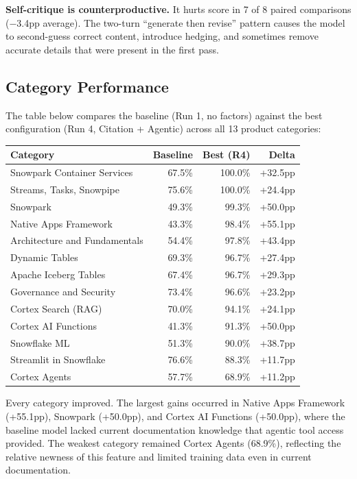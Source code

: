 \documentclass[11pt,letterpaper]{article}
\begin{document}
\textbf{Self-critique is counterproductive.} It hurts score in 7 of 8 paired comparisons ($-$3.4pp average). The two-turn ``generate then revise'' pattern causes the model to second-guess correct content, introduce hedging, and sometimes remove accurate details that were present in the first pass.

\subsection{Category Performance}

The table below compares the baseline (Run 1, no factors) against the best configuration (Run 4, Citation + Agentic) across all 13 product categories:

\begin{table}[H]
\centering
\small
\begin{tabular}{l r r r}
\toprule
\textbf{Category} & \textbf{Baseline} & \textbf{Best (R4)} & \textbf{Delta} \\
\midrule
Snowpark Container Services  & 67.5\% & 100.0\% & +32.5pp \\
Streams, Tasks, Snowpipe     & 75.6\% & 100.0\% & +24.4pp \\
Snowpark                     & 49.3\% & 99.3\%  & +50.0pp \\
Native Apps Framework        & 43.3\% & 98.4\%  & +55.1pp \\
Architecture and Fundamentals & 54.4\% & 97.8\% & +43.4pp \\
Dynamic Tables               & 69.3\% & 96.7\%  & +27.4pp \\
Apache Iceberg Tables        & 67.4\% & 96.7\%  & +29.3pp \\
Governance and Security      & 73.4\% & 96.6\%  & +23.2pp \\
Cortex Search (RAG)          & 70.0\% & 94.1\%  & +24.1pp \\
Cortex AI Functions          & 41.3\% & 91.3\%  & +50.0pp \\
Snowflake ML                 & 51.3\% & 90.0\%  & +38.7pp \\
Streamlit in Snowflake       & 76.6\% & 88.3\%  & +11.7pp \\
Cortex Agents                & 57.7\% & 68.9\%  & +11.2pp \\
\bottomrule
\end{tabular}
\end{table}

Every category improved. The largest gains occurred in Native Apps Framework (+55.1pp), Snowpark (+50.0pp), and Cortex AI Functions (+50.0pp), where the baseline model lacked current documentation knowledge that agentic tool access provided. The weakest category remained Cortex Agents (68.9\%), reflecting the relative newness of this feature and limited training data even in current documentation.
\end{document}
